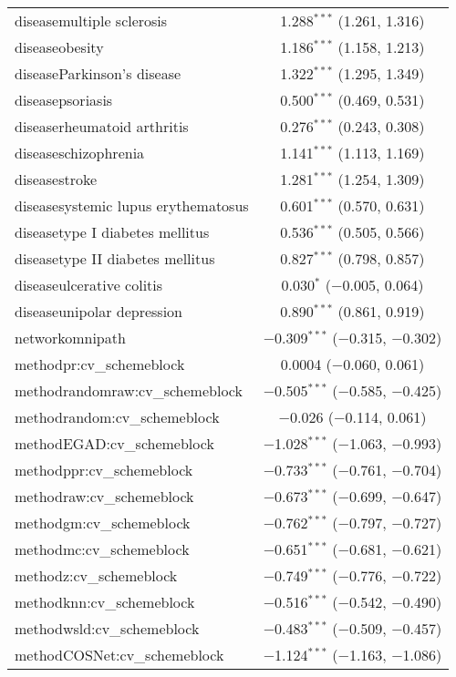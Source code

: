 \begin{table}[!htbp]
\begin{tabular}{@{\extracolsep{5pt}}lc}
  diseasemultiple sclerosis & 1.288$^{***}$ (1.261, 1.316) \\ 
  diseaseobesity & 1.186$^{***}$ (1.158, 1.213) \\ 
  diseaseParkinson's disease & 1.322$^{***}$ (1.295, 1.349) \\ 
  diseasepsoriasis & 0.500$^{***}$ (0.469, 0.531) \\ 
  diseaserheumatoid arthritis & 0.276$^{***}$ (0.243, 0.308) \\ 
  diseaseschizophrenia & 1.141$^{***}$ (1.113, 1.169) \\ 
  diseasestroke & 1.281$^{***}$ (1.254, 1.309) \\ 
  diseasesystemic lupus erythematosus & 0.601$^{***}$ (0.570, 0.631) \\ 
  diseasetype I diabetes mellitus & 0.536$^{***}$ (0.505, 0.566) \\ 
  diseasetype II diabetes mellitus & 0.827$^{***}$ (0.798, 0.857) \\ 
  diseaseulcerative colitis & 0.030$^{*}$ ($-$0.005, 0.064) \\ 
  diseaseunipolar depression & 0.890$^{***}$ (0.861, 0.919) \\ 
  networkomnipath & $-$0.309$^{***}$ ($-$0.315, $-$0.302) \\ 
  methodpr:cv\_schemeblock & 0.0004 ($-$0.060, 0.061) \\ 
  methodrandomraw:cv\_schemeblock & $-$0.505$^{***}$ ($-$0.585, $-$0.425) \\ 
  methodrandom:cv\_schemeblock & $-$0.026 ($-$0.114, 0.061) \\ 
  methodEGAD:cv\_schemeblock & $-$1.028$^{***}$ ($-$1.063, $-$0.993) \\ 
  methodppr:cv\_schemeblock & $-$0.733$^{***}$ ($-$0.761, $-$0.704) \\ 
  methodraw:cv\_schemeblock & $-$0.673$^{***}$ ($-$0.699, $-$0.647) \\ 
  methodgm:cv\_schemeblock & $-$0.762$^{***}$ ($-$0.797, $-$0.727) \\ 
  methodmc:cv\_schemeblock & $-$0.651$^{***}$ ($-$0.681, $-$0.621) \\ 
  methodz:cv\_schemeblock & $-$0.749$^{***}$ ($-$0.776, $-$0.722) \\ 
  methodknn:cv\_schemeblock & $-$0.516$^{***}$ ($-$0.542, $-$0.490) \\ 
  methodwsld:cv\_schemeblock & $-$0.483$^{***}$ ($-$0.509, $-$0.457) \\ 
  methodCOSNet:cv\_schemeblock & $-$1.124$^{***}$ ($-$1.163, $-$1.086) \\ 

\end{tabular}
\end{table}
